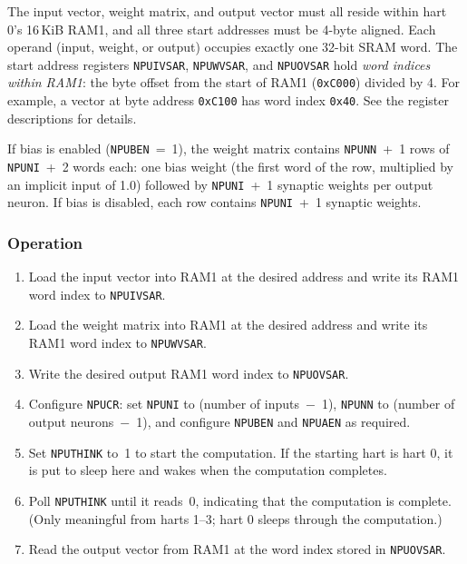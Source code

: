 The input vector, weight matrix, and output vector must all reside within hart 0's 16\,KiB RAM1, and all three start addresses must be 4-byte aligned. Each operand (input, weight, or output) occupies exactly one 32-bit SRAM word. The start address registers \texttt{NPUIVSAR}, \texttt{NPUWVSAR}, and \texttt{NPUOVSAR} hold \textit{word indices within RAM1}: the byte offset from the start of RAM1 (\texttt{0xC000}) divided by 4. For example, a vector at byte address \texttt{0xC100} has word index \texttt{0x40}. See the register descriptions for details.

If bias is enabled (\texttt{NPUBEN}~=~1), the weight matrix contains \texttt{NPUNN}~+~1 rows of \texttt{NPUNI}~+~2 words each: one bias weight (the first word of the row, multiplied by an implicit input of 1.0) followed by \texttt{NPUNI}~+~1 synaptic weights per output neuron. If bias is disabled, each row contains \texttt{NPUNI}~+~1 synaptic weights.

\subsubsection*{Operation}

\begin{enumerate}
    \item Load the input vector into RAM1 at the desired address and write its RAM1 word index to \texttt{NPUIVSAR}.
    \item Load the weight matrix into RAM1 at the desired address and write its RAM1 word index to \texttt{NPUWVSAR}.
    \item Write the desired output RAM1 word index to \texttt{NPUOVSAR}.
    \item Configure \texttt{NPUCR}: set \texttt{NPUNI} to (number of inputs~$-$~1), \texttt{NPUNN} to (number of output neurons~$-$~1), and configure \texttt{NPUBEN} and \texttt{NPUAEN} as required.
    \item Set \texttt{NPUTHINK} to~1 to start the computation. If the starting hart is hart 0, it is put to sleep here and wakes when the computation completes.
    \item Poll \texttt{NPUTHINK} until it reads~0, indicating that the computation is complete. (Only meaningful from harts 1--3; hart 0 sleeps through the computation.)
    \item Read the output vector from RAM1 at the word index stored in \texttt{NPUOVSAR}.
\end{enumerate}
